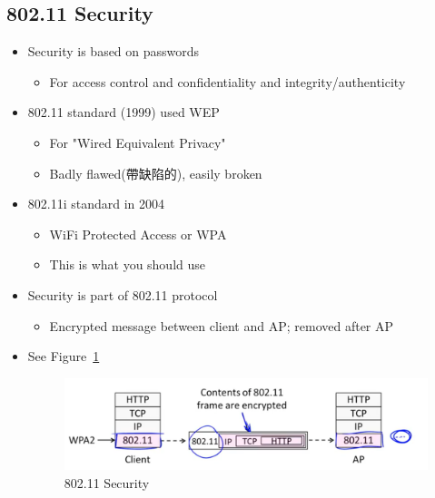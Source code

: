\documentclass[12pt]{ctexart}   %
\begin{document}
	\subsection{802.11 Security}
	\begin{itemize}
		\item Security is based on passwords
		\begin{itemize}
			\item For access control and confidentiality and integrity/authenticity
		\end{itemize}

		\item 802.11 standard (1999) used WEP
		\begin{itemize}
			\item For "Wired Equivalent Privacy"
			\item Badly flawed(帶缺陷的), easily broken
		\end{itemize}

		\item 802.11i standard in 2004
		\begin{itemize}
			\item WiFi Protected Access or WPA
			\item This is what you should use
		\end{itemize}

		\item Security is part of 802.11 protocol
		\begin{itemize}
			\item Encrypted message between client and AP; removed after AP
		\end{itemize}
		\item See Figure~\ref{fig:10-4-3}
		  
		\begin{figure}[h!] %
		\centering
		\includegraphics[scale=0.7]{images/10-4-3}
		\caption{802.11 Security}
		\label{fig:10-4-3}
		\end{figure}
	\end{itemize}
\end{document}
